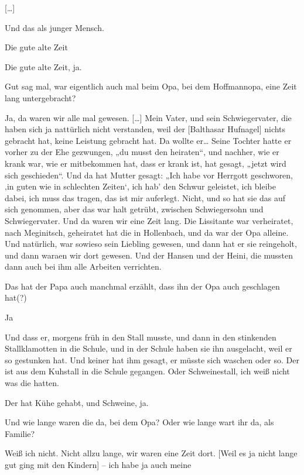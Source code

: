 \documentclass[ngerman,]{article}
\providecommand{\tightlist}{%
  \setlength{\itemsep}{0pt}\setlength{\parskip}{0pt}}
\begin{document}
\begin{multicols}{3}
{[}\ldots{}{]}

\begin{description}
\tightlist
\item[Käthe]
Und das als junger Mensch.
\item[Friedrich (ironisch)]
Die gute alte Zeit
\item[Käthe]
Die gute alte Zeit, ja.
\item[Ruth]
Gut sag mal, war eigentlich auch mal beim Opa, bei dem Hoffmannopa, eine
Zeit lang untergebracht?
\item[Käthe]
Ja, da waren wir alle mal gewesen. {[}\ldots{}{]} Mein Vater, und sein
Schwiegervater, die haben sich ja nattürlich nicht verstanden, weil der
{[}Balthasar Hufnagel{]} nichts gebracht hat, keine Leistung gebracht
hat. Da wollte er\ldots{} Seine Tochter hatte er vorher zu der Ehe
gezwungen, „du musst den heiraten“, und nachher, wie er krank war, wie
er mitbekommen hat, dass er krank ist, hat gesagt, „jetzt wird sich
geschieden“. Und da hat Mutter gesagt: „Ich habe vor Herrgott
geschworen, ‚in guten wie in schlechten Zeiten‘, ich hab' den Schwur
geleistet, ich bleibe dabei, ich muss das tragen, das ist mir auferlegt.
Nicht, und so hat sie das auf sich genommen, aber das war halt getrübt,
zwischen Schwiegersohn und Schwiegervater. Und da waren wir eine Zeit
lang. Die Lissitante war verheiratet, nach Meginitsch, geheiratet hat
die in Hollenbach, und da war der Opa alleine. Und natürlich, war
sowieso sein Liebling gewesen, und dann hat er sie reingeholt, und dann
waraen wir dort gewesen. Und der Hansen und der Heini, die mussten dann
auch bei ihm alle Arbeiten verrichten.
\item[Ruth]
Das hat der Papa auch manchmal erzählt, dass ihn der Opa auch geschlagen
hat(?)
\item[Käthe]
Ja
\item[Ruth]
Und dass er, morgens früh in den Stall musste, und dann in den
stinkenden Stallklamotten in die Schule, und in der Schule haben sie ihn
ausgelacht, weil er so gestunken hat. Und keiner hat ihm gesagt, er
müsste sich waschen oder so. Der ist aus dem Kuhstall in die Schule
gegangen. Oder Schweinestall, ich weiß nicht was die hatten.
\item[Käthe]
Der hat Kühe gehabt, und Schweine, ja.
\item[Ruth]
Und wie lange waren die da, bei dem Opa? Oder wie lange wart ihr da, als
Familie?
\item[Käthe]
Weiß ich nicht. Nicht allzu lange, wir waren eine Zeit dort. {[}Weil es
ja nicht lange gut ging mit den Kindern{]} – ich habe ja auch meine

\end{description}
\end{multicols}
\end{document}
